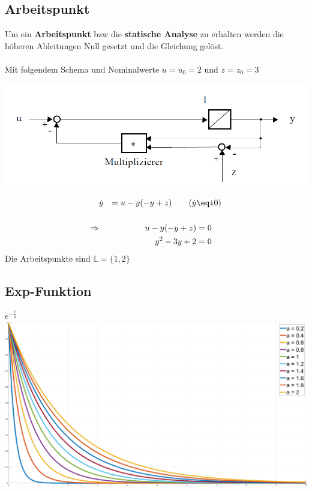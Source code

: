 \subsection{Arbeitspunkt}
Um ein \textbf{Arbeitspunkt} bzw die \textbf{statische Analyse} zu erhalten werden die höheren Ableitungen Null gesetzt und die Gleichung gelöst.\\~\\
\noindent Mit folgendem Schema und Nominalwerte $u=u_0=2$ und $z=z_0 = 3$\\
\begin{center}
	\begin{minipage}{0.20\textwidth}
		\begin{center}
			\includegraphics[width=\linewidth,keepaspectratio=true]{Images/arbeitspunkt}\\
		\end{center}
	\end{minipage}%
	\begin{minipage}{0.3\textwidth}
\begin{align*}
	&\dot{y} &= u - y(-y + z) \qquad (\dot{y} &\eqi 0) \\ \\
	\Rightarrow& & u - y(-y + z) &= 0\\
	&&y^2 - 3y +2 &= 0 \\
\end{align*}
Die Arbeitspunkte sind $\mathbb{L} = \{1, 2\}$
	\end{minipage}
\end{center}

\subsection{Exp-Funktion} 
\begin{center}
	$e^{-\frac{t}{a}}$\\
\includegraphics[width=\linewidth,keepaspectratio=true]{Images/exp}
\end{center}




